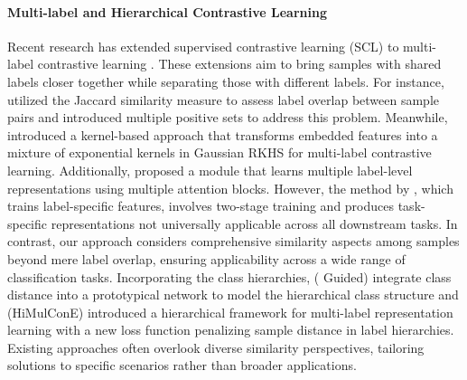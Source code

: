 \paragraph{Multi-label and Hierarchical Contrastive Learning}
Recent research has extended supervised contrastive learning (SCL) to multi-label contrastive learning \citep{dao2021multi, malkinski2022multi, dao2021contrast, zaigrajewcontrastive, zhang2024multi}. These extensions aim to bring samples with shared labels closer together while separating those with different labels. For instance, \citet{zaigrajewcontrastive} utilized the Jaccard similarity measure to assess label overlap between sample pairs and \citet{zhang2024multi} introduced multiple positive sets to address this problem. Meanwhile, \citet{sajedi2023end} introduced a kernel-based approach that transforms embedded features into a mixture of exponential kernels in Gaussian RKHS for multi-label contrastive learning. Additionally, \citet{dao2021contrast} proposed a module that learns multiple label-level representations using multiple attention blocks. However, the method by \citet{dao2021contrast}, which trains label-specific features, involves two-stage training and produces task-specific representations not universally applicable across all downstream tasks.  In contrast, our approach considers comprehensive similarity aspects among samples beyond mere label overlap, ensuring applicability across a wide range of classification tasks. Incorporating the class hierarchies, \citet{landrieu2021leveraging} (
Guided) integrate class distance into a prototypical network to model the hierarchical class structure and \citet{zhang2022use} (HiMulConE) introduced a hierarchical framework for multi-label representation learning with a new loss function penalizing sample distance in label hierarchies. Existing approaches often overlook diverse similarity perspectives, tailoring solutions to specific scenarios rather than broader applications.